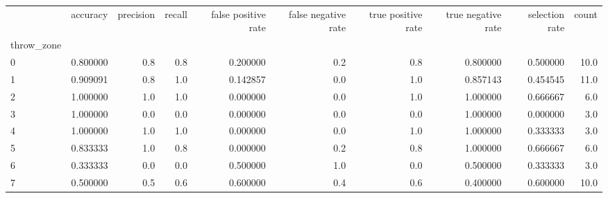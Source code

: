 \begin{tabular}{lrrrrrrrrr}
\toprule
{} &  accuracy &  precision &  recall &  false positive rate &  false negative rate &  true positive rate &  true negative rate &  selection rate &  count \\
throw\_zone &           &            &         &                      &                      &                     &                     &                 &        \\
\midrule
0          &  0.800000 &        0.8 &     0.8 &             0.200000 &                  0.2 &                 0.8 &            0.800000 &        0.500000 &   10.0 \\
1          &  0.909091 &        0.8 &     1.0 &             0.142857 &                  0.0 &                 1.0 &            0.857143 &        0.454545 &   11.0 \\
2          &  1.000000 &        1.0 &     1.0 &             0.000000 &                  0.0 &                 1.0 &            1.000000 &        0.666667 &    6.0 \\
3          &  1.000000 &        0.0 &     0.0 &             0.000000 &                  0.0 &                 0.0 &            1.000000 &        0.000000 &    3.0 \\
4          &  1.000000 &        1.0 &     1.0 &             0.000000 &                  0.0 &                 1.0 &            1.000000 &        0.333333 &    3.0 \\
5          &  0.833333 &        1.0 &     0.8 &             0.000000 &                  0.2 &                 0.8 &            1.000000 &        0.666667 &    6.0 \\
6          &  0.333333 &        0.0 &     0.0 &             0.500000 &                  1.0 &                 0.0 &            0.500000 &        0.333333 &    3.0 \\
7          &  0.500000 &        0.5 &     0.6 &             0.600000 &                  0.4 &                 0.6 &            0.400000 &        0.600000 &   10.0 \\
\bottomrule
\end{tabular}
